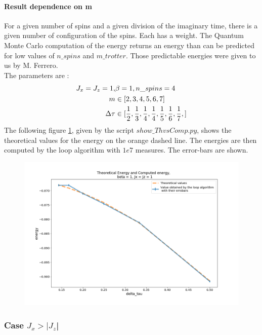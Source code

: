 \documentclass[a4paper,12pt,twoside]{article}
\begin{document}
	\paragraph{Result dependence on m}
	For a given number of spins and a given division of the imaginary time, there is a given number of configuration of the spins. Each has a weight. The Quantum Monte Carlo computation of the energy returns an energy than can be predicted for low values of $n\_spins$ and $m\_trotter$. Those predictable energies were given to us by M. Ferrero. \\ The parameters are :
	\begin{equation}
		\centering
		\begin{split}
			J_x = J_z = 1, & \beta = 1, n\_spins = 4 \\
			m & \in [2, 3, 4, 5, 6, 7] \\
			\Delta\tau & \in [\frac{1}{2}, \frac{1}{3}, \frac{1}{4}, \frac{1}{4}, \frac{1}{5}, \frac{1}{6}, \frac{1}{7}, ]
		\end{split}
	\end{equation}
	The following figure \ref{varymx=y}, given by the script $show\_ThvsComp.py$, shows the theoretical values for the energy on the orange dashed line. The energies are then computed by the loop algorithm with $1e7$ measures. The error-bars are shown.
	\begin{figure}[!h]
		\centering
		\includegraphics[width=12cm]{ThvsComp_x=z=1_m2-8.png}
		\caption{ }
		\label{varymx=y}
	\end{figure}
	
	\newpage
	\subsubsection{Case $J_{x} > |J_{z}$|}
	
\end{document}
